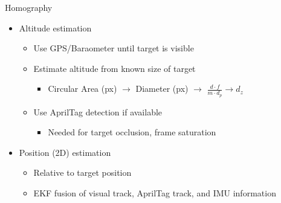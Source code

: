\documentclass[]{beamer}
\begin{document}
\begin{frame}{Homography}
    \begin{itemize}
        \item Altitude estimation
            \begin{itemize}
                \item Use GPS/Baraometer until target is visible
                \item Estimate altitude from known size of target
                    \begin{itemize}
                        \item Circular Area (px) $\rightarrow$ Diameter (px) $\rightarrow$ $\frac{d\cdot
                            f}{m\cdot d_p}\rightarrow d_z$
                    \end{itemize}
                \item Use AprilTag detection if available
                    \begin{itemize}
                        \item Needed for target occlusion, frame saturation
                    \end{itemize}
            \end{itemize}
        \item Position (2D) estimation
            \begin{itemize}
                \item Relative to target position
                \item EKF fusion of visual track, AprilTag track, and IMU information
            \end{itemize}
    \end{itemize}
\end{frame}
\end{document}
